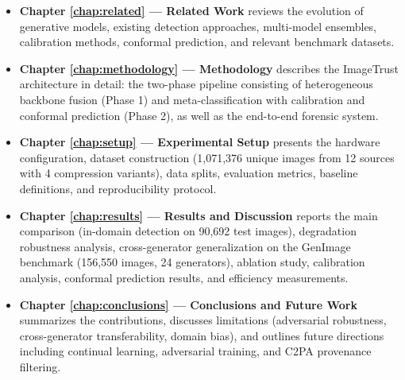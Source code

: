 \begin{itemize}
    \item \textbf{Chapter \ref{chap:related} --- Related Work} reviews the evolution of generative models, existing detection approaches, multi-model ensembles, calibration methods, conformal prediction, and relevant benchmark datasets.

    \item \textbf{Chapter \ref{chap:methodology} --- Methodology} describes the ImageTrust architecture in detail: the two-phase pipeline consisting of heterogeneous backbone fusion (Phase 1) and meta-classification with calibration and conformal prediction (Phase 2), as well as the end-to-end forensic system.

    \item \textbf{Chapter \ref{chap:setup} --- Experimental Setup} presents the hardware configuration, dataset construction (1,071,376 unique images from 12 sources with 4 compression variants), data splits, evaluation metrics, baseline definitions, and reproducibility protocol.

    \item \textbf{Chapter \ref{chap:results} --- Results and Discussion} reports the main comparison (in-domain detection on 90,692 test images), degradation robustness analysis, cross-generator generalization on the GenImage benchmark (156,550 images, 24 generators), ablation study, calibration analysis, conformal prediction results, and efficiency measurements.

    \item \textbf{Chapter \ref{chap:conclusions} --- Conclusions and Future Work} summarizes the contributions, discusses limitations (adversarial robustness, cross-generator transferability, domain bias), and outlines future directions including continual learning, adversarial training, and C2PA provenance filtering.
\end{itemize}
